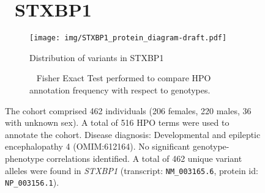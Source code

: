 \begin{figure}[htbp]
\section*{ STXBP1}
\centering
\begin{subfigure}[b]{0.95\textwidth}
\centering
\texttt{[image:  img/STXBP1\_protein\_diagram-draft.pdf]} 
\captionsetup{justification=raggedright,singlelinecheck=false}
\caption{Distribution of variants in STXBP1}
\end{subfigure}

\vspace{2em}

\begin{subfigure}[b]{0.95\textwidth}
\centering
{}
\captionsetup{justification=raggedright,singlelinecheck=false}
\caption{             Fisher Exact Test performed to compare HPO annotation frequency with respect to genotypes. }
\end{subfigure}

\vspace{2em}

\caption{ The cohort comprised 462 individuals (206 females, 220 males, 36 with unknown sex). A total of 516 HPO terms were used to annotate the cohort. Disease diagnosis: Developmental and epileptic encephalopathy 4 (OMIM:612164). No significant genotype-phenotype correlations identified. A total of 462 unique variant alleles were found in \textit{STXBP1} (transcript: \texttt{NM\_003165.6}, protein id: \texttt{NP\_003156.1}).}
\end{figure}
